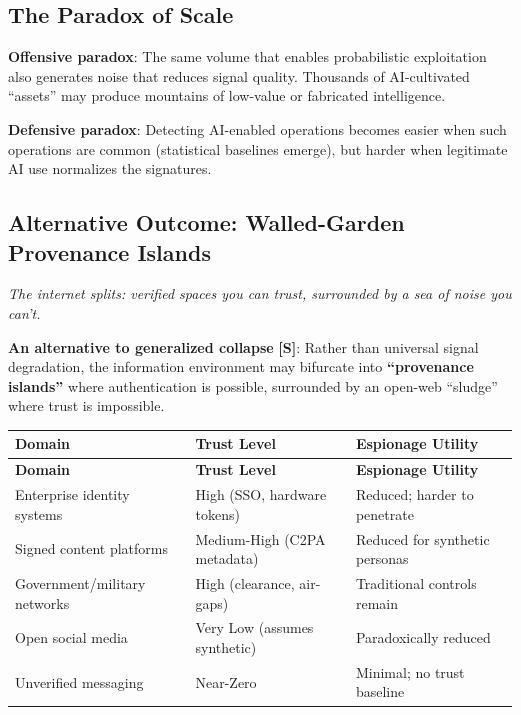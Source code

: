 \documentclass[11pt,letterpaper]{article}
\newcommand{\etraneed}[1]{\par\ifdim\pagegoal<\maxdimen\ifdim\pagetotal<\pagegoal\ifdim\dimexpr\pagegoal-\pagetotal\relax<\dimexpr#1\relax\newpage\fi\fi\fi}
\begin{document}
\subsection{The Paradox of Scale}

\textbf{Offensive paradox}: The same volume that enables probabilistic exploitation also generates noise that reduces signal quality. Thousands of AI-cultivated ``assets'' may produce mountains of low-value or fabricated intelligence.

\textbf{Defensive paradox}: Detecting AI-enabled operations becomes easier when such operations are common (statistical baselines emerge), but harder when legitimate AI use normalizes the signatures.

\subsection{Alternative Outcome: Walled-Garden Provenance Islands}

\textit{The internet splits: verified spaces you can trust, surrounded by a sea of noise you can't.}

\textbf{An alternative to generalized collapse} \textbf{[S]}: Rather than universal signal degradation, the information environment may bifurcate into \textbf{``provenance islands''} where authentication is possible, surrounded by an open-web ``sludge'' where trust is impossible.

\etraneed{12\baselineskip}
{\small
\begin{longtable}{L{4cm}L{3cm}L{4.5cm}}
\toprule
\textbf{Domain} & \textbf{Trust Level} & \textbf{Espionage Utility} \\
\midrule
\endfirsthead
\toprule
\textbf{Domain} & \textbf{Trust Level} & \textbf{Espionage Utility} \\
\midrule
\endhead
Enterprise identity systems & High (SSO, hardware tokens) & Reduced; harder to penetrate \\*
Signed content platforms & Medium-High (C2PA metadata) & Reduced for synthetic personas \\
Government/military networks & High (clearance, air-gaps) & Traditional controls remain \\
Open social media & Very Low (assumes synthetic) & Paradoxically reduced \\*
Unverified messaging & Near-Zero & Minimal; no trust baseline \\
\bottomrule
\end{longtable}}
\end{document}
